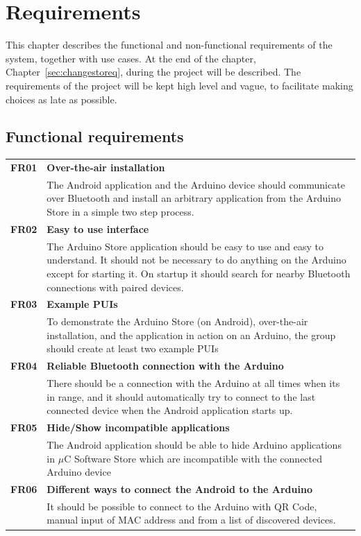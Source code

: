 \chapter{Requirements}
This chapter describes the functional and non-functional requirements of the system, together with use cases. At the end of the chapter, Chapter~\ref{sec:changestoreq}, during the project will be described.
The requirements of the project will be kept high level and vague, to facilitate making choices as late as possible.

\section{Functional requirements}
	\begin{table}[H]
	\begin{tabularx}{\linewidth}{lX}

		\textbf{FR01} & \textbf{Over-the-air installation}\\
 		              & The Android application and the Arduino device should communicate over 
                        Bluetooth and install an arbitrary application from the Arduino Store in a simple two step process.\\

		\textbf{FR02} & \textbf{Easy to use interface}\\
                      & The Arduino Store application should be easy to use and easy to understand. It should not be necessary to do anything on the Arduino except for starting it. On startup it should search for nearby Bluetooth connections with paired devices.\\

 		\textbf{FR03} & \textbf{Example PUIs}\\
                      & To demonstrate the Arduino Store (on Android), over-the-air installation, and the application in action on an Arduino, the group should create at least two example PUIs \\

		\textbf{FR04} & \textbf{Reliable Bluetooth connection with the Arduino}\\
                      & There should be a connection with the Arduino at all times when its in range, and it should automatically try to connect to the last connected device when the Android application starts up.\\

        \textbf{FR05} & \textbf{Hide/Show incompatible applications}\\
                      & The Android application should be able to hide Arduino applications in $\mu$C Software Store which are incompatible with the connected Arduino device\\

        \textbf{FR06} & \textbf{Different ways to connect the Android to the Arduino}\\
                      & It should be possible to connect to the Arduino with QR Code, manual input of MAC address and from a list of discovered devices.\\

	\end{tabularx}
	\end{table}

